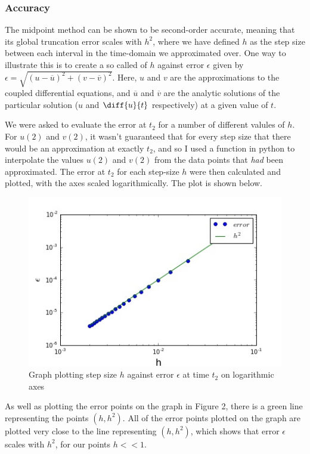 \documentclass[11pt,a4paper]{article}
\begin{document}
\subsubsection*{Accuracy}
The midpoint method can be shown to be second-order accurate, meaning that its global truncation error scales with $h^2$, where we have defined $h$ as the step size between each interval in the time-domain we approximated over. One way to illustrate this is to create a so called  of $h$ against error $\epsilon$ given by $\epsilon=\sqrt{(u-\overline{u})^2+(v-\overline{v})^2}$.  Here, $u$ and $v$ are the approximations to the coupled differential equations, and $\overline{u}$ and $\overline{v}$ are the analytic solutions of the particular solution ($u$ and $\diff{u}{t}$ respectively) at a given value of $t$. 

We were asked to evaluate the error at $t_2$ for a number of different valules of $h$. For $u(2)$ and $v(2)$, it wasn't guaranteed that for every step size that there would be an approximation at exactly $t_2$, and so I used a function in python to interpolate the values $u(2)$ and $v(2)$ from the data points that \textit{had} been approximated. The error at $t_2$ for each step-size $h$ were then calculated and plotted, with the axes scaled logarithmically. The plot is shown below.

\begin{figure}[h]
\caption{Graph plotting step size $h$ against error $\epsilon$ at time $t_2$ on logarithmic axes}
\includegraphics[scale=0.6]{error.jpg}
\centering
\end{figure}

As well as plotting the error points on the graph in Figure 2, there is a green line representing the points $(h,h^2)$. All of the error points plotted on the graph are plotted very close to the line representing $(h,h^2)$, which shows that error $\epsilon$ scales with $h^2$, for our points $h<<1$.
\end{document}
